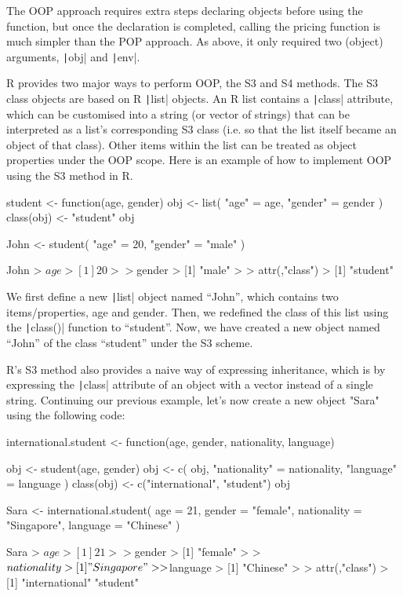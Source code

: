 The OOP approach requires extra steps declaring objects before using the function, but once the declaration is completed, calling the pricing function is much simpler than the POP approach. As above, it only required two (object) arguments, \texttt|obj| and \texttt|env|.

R provides two major ways to perform OOP, the S3 and S4 methods. The S3 class objects are based on R \texttt|list| objects. An R list contains a \texttt|class| attribute, which can be customised into a string (or vector of strings) that can be interpreted as a list's corresponding S3 class (i.e. so that the list itself became an object of that class). Other items within the list can be treated as object properties under the OOP scope. Here is an example of how to implement OOP using the S3 method in R.

\begin{Rminted}
student <- function(age, gender) {
    obj <- list(
        "age" = age,
        "gender" = gender
    )
    class(obj) <- "student"
    obj
}

John <- student(
    "age" = 20,
    "gender" = "male"
)

John
> $age
> [1] 20
> 
> $gender
> [1] "male"
> 
> attr(,"class")
> [1] "student"
\end{Rminted}

We first define a new \texttt|list| object named ``John'', which contains two items/properties, age and gender. Then, we redefined the class of this list using the \texttt|class()| function to ``student''. Now, we have created a new object named ``John'' of the class ``student'' under the S3 scheme.

R's S3 method also provides a naive way of expressing inheritance, which is by expressing the \texttt|class| attribute of an object with a vector instead of a single string. Continuing our previous example, let's now create a new object "Sara" using the following code:

\begin{Rminted}
international.student <- function(age, gender, nationality, language) {
    
    obj <- student(age, gender)
    obj <- c(
        obj,
        "nationality" = nationality,
        "language" = language
    )
    class(obj) <- c("international", "student")
    obj
}

Sara <- international.student(
    age = 21,
    gender = "female",
    nationality = "Singapore",
    language = "Chinese"
)

Sara
> $age
> [1] 21
> 
> $gender
> [1] "female"
> 
> $nationality
> [1] "Singapore"
> 
> $language
> [1] "Chinese"
> 
> attr(,"class")
> [1] "international" "student"    
\end{Rminted}


